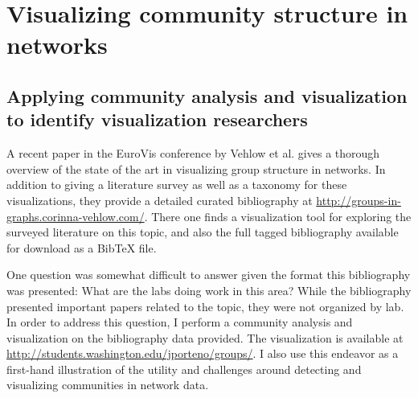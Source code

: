 \hypertarget{visualization}{\section{Visualizing community structure in
networks}\label{visualization}}

\protect\hyperlink{visualization}{}

\hypertarget{visualizing-labs}{\subsection{Applying community analysis
and visualization to identify visualization
researchers}\label{visualizing-labs}}

\protect\hyperlink{visualizing-labs}{}

A recent paper in the EuroVis conference by Vehlow et al.
\autocite{vehlow_state_2015} gives a thorough overview of the state of
the art in visualizing group structure in networks. In addition to
giving a literature survey as well as a taxonomy for these
visualizations, they provide a detailed curated bibliography at
\url{http://groups-in-graphs.corinna-vehlow.com/}. There one finds a
visualization tool for exploring the surveyed literature on this topic,
and also the full tagged bibliography available for download as a BibTeX
file.

One question was somewhat difficult to answer given the format this
bibliography was presented: What are the labs doing work in this area?
While the bibliography presented important papers related to the topic,
they were not organized by lab. In order to address this question, I
perform a community analysis and visualization on the bibliography data
provided. The visualization is available at
\url{http://students.washington.edu/jporteno/groups/}. I also use this
endeavor as a first-hand illustration of the utility and challenges
around detecting and visualizing communities in network data.

